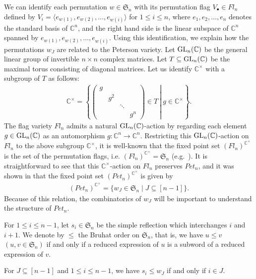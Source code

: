 We can identify each permutation $w\in\mathfrak{S}_n$ with its permutation flag $V_{\bullet}\in Fl_n$ defined by $V_i =\langle e_{w(1)}, e_{w(2)},\ldots, e_{w(i)}\rangle$ for $1\le i\le n$, where $e_1,e_2,\ldots,e_n$ denotes the standard basis of ${\mathbb C}^n$, and the right hand side is the linear subspace of ${\mathbb C}^n$ spanned by $e_{w(1)}, e_{w(2)},\ldots, e_{w(i)}$. Using this identification, we explain how the permutations $w_J$ are related to the Peterson variety. Let ${\rm GL}_n({\mathbb C})$ be the general linear group of invertible $n\times n$ complex matrices. Let $T\subseteq {\rm GL}_n({\mathbb C})$ be the maximal torus consisting of diagonal matrices. Let us identify ${\mathbb C}^{\times}$ with a subgroup of $T$ as follows: 
\begin{align}\label{eq: C-starsubgroup}
{\mathbb C}^{\times} = 
\left\{
\left.
\begin{pmatrix}
g & & & \\
 & g^2 & & \\
 & & \ddots & \\
 & & & g^n 
\end{pmatrix}
\in T\ 
\right| \ g\in {\mathbb C}^{\times}
\right\}.
\end{align}
The flag variety $Fl_n$ admits a natural ${\rm GL}_n({\mathbb C})$-action by regarding each element $g\in {\rm GL}_n({\mathbb C})$ as an automorphism $g\colon {\mathbb C}^n\rightarrow {\mathbb C}^n$. Restricting this ${\rm GL}_n({\mathbb C})$-action on $Fl_n$ to the above subgroup ${\mathbb C}^{\times}$, it is well-known that the fixed point set $(Fl_n)^{{\mathbb C}^{\times}}$ is the set of the permutation flags, i.e. $(Fl_n)^{{\mathbb C}^{\times}}=\mathfrak{S}_n$ (e.g.~\cite[proof of Lemma~2 in Sect.~10.1]{fult97}). It is straightforward to see that this ${\mathbb C}^{\times}$-action on $Fl_n$ preserves $Pet_{n}$, and it was shown in \cite{HaTy} that the fixed point set $(Pet_{n})^{{\mathbb C}^{\times}}$ is given by
\begin{align}\label{eq: fixed points of Pet}
(Pet_{n})^{{\mathbb C}^{\times}} =\{w_J \in\mathfrak{S}_n \mid J\subseteq [n-1]\}.
\end{align}
Because of this relation, the combinatorics of $w_J$ will be important to understand the structure of $Pet_{n}$.

For $1\le i\le n-1$, let $s_i\in\mathfrak{S}_n$ be the simple reflection which interchanges $i$ and~$i+1$. We denote by $\le$ the Bruhat order on $\mathfrak{S}_n$, that is, we have $u\le v$ $(u,v\in\mathfrak{S}_n)$ if and only if a reduced expression of $u$ is a subword of a reduced expression of $v$.
\begin{lemma}\label{lem: So-san's lemma 1}
For $J\subseteq[n-1]$ and $1\le i\le n-1$, we have 
$s_i\le w_J$ if and only if $i\in J$.
\end{lemma}

